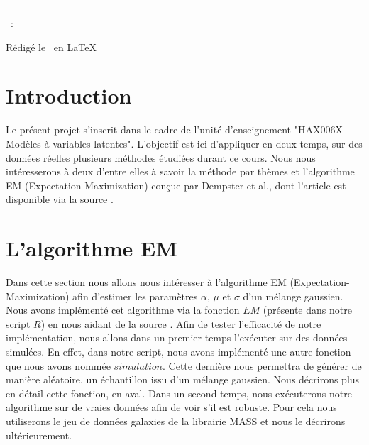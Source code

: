 \documentclass[a4paper,french,10pt]{article}
\begin{document}
	
	\title{\vspace{-1in}} %
	\author{} %
	\date{} %
	\maketitle %
	
	\usebox{\myReportTitle}
	\vspace{1in} %
	
	{\centering \huge \assignmentName \par}
	{\centering \noindent\rule{4in}{0.1pt} \par}
	\vspace{0.05in}
	{\centering \courseCode~: \courseName~ \par}
	{\centering Rédigé le \pubDate\ en \LaTeX \par}
	\vspace{1in}
	
	\tableofcontents
	\newpage
	
	

\section{Introduction}
Le présent projet s'inscrit dans le cadre de l'unité d'enseignement "HAX006X Modèles à variables latentes". L'objectif est ici d'appliquer en deux temps, sur des données réelles plusieurs méthodes étudiées durant ce cours. Nous nous intéresserons à deux d'entre elles à savoir la méthode par thèmes et l'algorithme EM (Expectation-Maximization) conçue par Dempster et al., dont l'article est disponible via la source \cite{article}.

\newpage

\section{L'algorithme EM}
Dans cette section nous allons nous intéresser à l'algorithme EM (Expectation-Maximization) afin d'estimer les paramètres $\alpha$, $\mu$ et $\sigma$ d'un mélange gaussien. Nous avons implémenté cet algorithme via la fonction $EM$ (présente dans notre script $R$) en nous aidant de la source \cite{EM_algorithm}. Afin de tester l'efficacité de notre implémentation, nous allons dans un premier temps l'exécuter sur des données simulées. En effet, dans notre script, nous avons implémenté une autre fonction que nous avons nommée $simulation$. Cette dernière nous permettra de générer de manière aléatoire, un échantillon issu d'un mélange gaussien. Nous décrirons plus en détail cette fonction, en aval. Dans un second temps, nous exécuterons notre algorithme sur de vraies données afin de voir s'il est robuste. Pour cela nous utiliserons le jeu de données galaxies de la librairie MASS et nous le décrirons ultérieurement.
\end{document}

